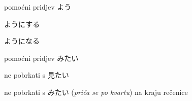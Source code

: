 
\author{Tomislav Mamić}

	
	\begin{hyou}
		\item pomoćni pridjev よう
		\begin{hyou}
			\item ようにする
			\item ようになる
		\end{hyou}
		\item pomoćni pridjev みたい
		\begin{hyou}
			\item ne pobrkati s 見たい
			\item ne pobrkati s みたい (\textit{priča se po kvartu}) na kraju rečenice
		\end{hyou}
	\end{hyou}
